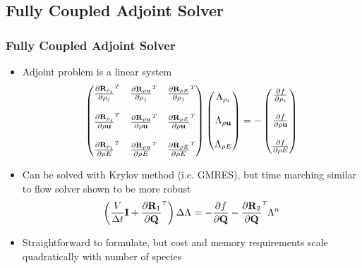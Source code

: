 \documentclass{beamer}
\begin{document}
\subsection{Fully Coupled Adjoint Solver}

\begin{frame}
  \frametitle{Fully Coupled Adjoint Solver}
  \begin{itemize}
    \item Adjoint problem is a linear system
      \begin{equation*}
        \begin{pmatrix}
          \rtdiff{\rho_i}{\rho_j} & 
          \rtdiff{\rho \vu}{\rho_j} & 
          \rtdiff{\rho E}{\rho_j} \\
          \\
          \rtdiff{\rho_i}{\rho \vu} & 
          \rtdiff{\rho \vu}{\rho \vu} & 
          \rtdiff{\rho E}{\rho \vu} \\
          \\
          \rtdiff{\rho_i}{\rho E} &
          \rtdiff{\rho \vu}{\rho E} &
          \rtdiff{\rho E}{\rho E}
        \end{pmatrix}
        \begin{pmatrix}
          \adjlam{\rho_i} \\ \\
          \adjlam{\rho \vu} \\ \\
          \adjlam{\rho E}
        \end{pmatrix}
        = -
        \begin{pmatrix}
          \pd{f}{\rho_i} \\ \\
          \pd{f}{\rho \vu} \\ \\
          \pd{f}{\rho E}
        \end{pmatrix}
      \end{equation*}
    \item Can be solved with Krylov method (i.e. GMRES), but time marching
      similar to flow solver shown to be more robust
      \begin{equation*}
        \left( \frac{V}{\Delta t} \mi + \rtdiff{1}{\mq} \right)
        \Delta \adjlam{}
        = -\pd{f}{\mq}
        - \rtdiff{2}{\mq} \adjlam{}^{n}
      \end{equation*}
    \item Straightforward to formulate, but cost and memory requirements
      scale quadratically with number of species
      
  \end{itemize}
\end{frame}
\end{document}
